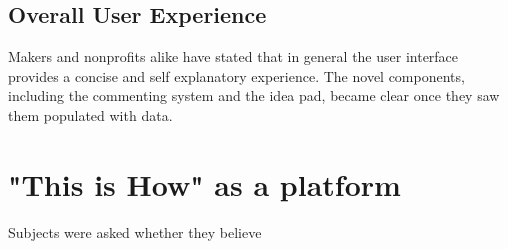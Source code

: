 \subsection{Overall User Experience}

Makers and nonprofits alike have stated that in general the user interface provides a concise and self explanatory experience. The novel components, including the commenting system and the idea pad, became clear once they saw them populated with data.     


\section{"This is How" as a platform}
Subjects were asked whether they believe 